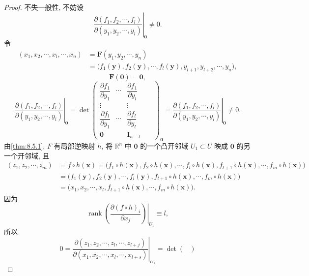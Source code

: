 \begin{proof}
不失一般性, 不妨设
\[
  \left.\frac{\partial(f_{1}, f_{2}, \cdots, f_{l})}{\partial(y_{1}, y_{2}, \cdots, y_{l})}\right|_{\boldsymbol{0}} \neq 0.
\]
令
\begin{align*}
  (x_{1}, x_{2}, \cdots, x_{l}, \cdots, x_{n}) &= \boldsymbol{F}(y_{1}, y_{2}, \cdots, y_{n}) \\
  &= \bigl(f_{1}(\boldsymbol{y}), f_{2}(\boldsymbol{y}), \cdots, f_{l}(\boldsymbol{y}), y_{l+1}, y_{l+2}, \cdots, y_{n}\bigr),
\end{align*}
\[
  \boldsymbol{F}(\boldsymbol{0}) = \boldsymbol{0},
\]
\[
  \left.\frac{\partial(f_{1}, f_{2}, \cdots, f_{l})}{\partial(y_{1}, y_{2}, \cdots, y_{l})}\right|_{\boldsymbol{0}} = \det\begin{pmatrix}
    \dfrac{\partial f_{1}}{\partial y_{1}} & \cdots & \dfrac{\partial f_{1}}{\partial y_{l}} & & \\
    \vdots & & \vdots & & \\
    \dfrac{\partial f_{l}}{\partial y_{1}} & \cdots & \dfrac{\partial f_{l}}{\partial y_{l}} & & \\
    \boldsymbol{0} & & \boldsymbol{I}_{n-l} & &
  \end{pmatrix}_{\boldsymbol{0}} = \left.\frac{\partial(f_{1}, f_{2}, \cdots, f_{l})}{\partial(y_{1}, y_{2}, \cdots, y_{l})}\right|_{\boldsymbol{0}} \neq 0.
\]
由\cref{thm:8.5.1}, $F$ 有局部逆映射 $h$, 将 $\mathbb{R}^{n}$ 中 $\boldsymbol{0}$ 的一个凸开邻域 $U_{1} \subset U$ 映成 $\boldsymbol{0}$ 的另一个开邻域, 且
\begin{align*}
  (z_{1}, z_{2}, \cdots, z_{m}) &= f \circ h(\boldsymbol{x}) = \bigl(f_{1} \circ h(\boldsymbol{x}), f_{2} \circ h(\boldsymbol{x}), \cdots, f_{l} \circ h(\boldsymbol{x}), f_{l+1} \circ h(\boldsymbol{x}), \cdots, f_{m} \circ h(\boldsymbol{x})\bigr) \\
  &= \bigl(f_{1}(\boldsymbol{y}), f_{2}(\boldsymbol{y}), \cdots, f_{l}(\boldsymbol{y}), f_{l+1} \circ h(\boldsymbol{x}), \cdots, f_{m} \circ h(\boldsymbol{x})\bigr) \\
  &= \bigl(x_{1}, x_{2}, \cdots, x_{l}, f_{l+1} \circ h(\boldsymbol{x}), \cdots, f_{m} \circ h(\boldsymbol{x})\bigr).
\end{align*}
因为
\[
  \left.\operatorname{rank}\left(\frac{\partial (f \circ h)_{i}}{\partial x_{j}}\right)\right|_{U_{1}} \equiv l,
\]
所以
\[
  0 = \left.\frac{\partial(z_{1}, z_{2}, \cdots, z_{l}, \cdots, z_{l+j})}{\partial(x_{1}, x_{2}, \cdots, x_{l}, \cdots, x_{l+s})}\right|_{U_{1}} = \left.\det\begin{pmatrix}

\end{pmatrix}\]
\end{proof}
